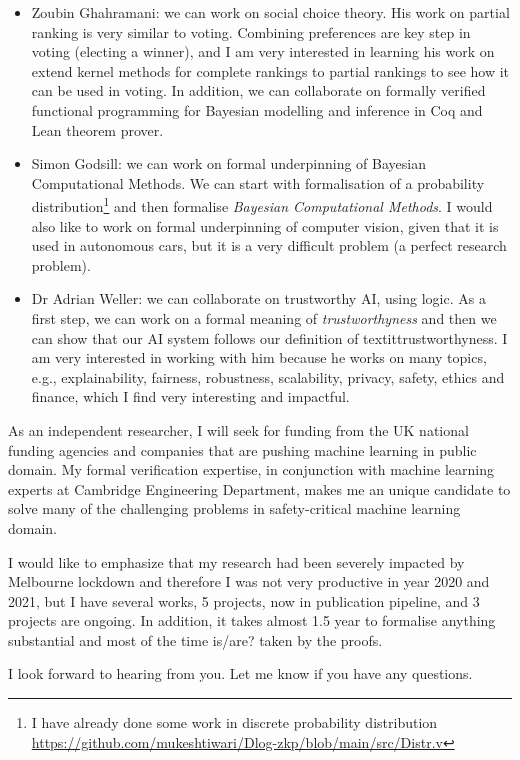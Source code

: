 \documentclass[11pt,a4paper,roman]{moderncv}
\begin{document}
\begin{itemize}
  \item Zoubin Ghahramani: we can work on social choice theory. His work 
 on partial ranking is very similar to voting. Combining preferences 
 are key step in voting (electing a winner), 
 and I am very interested in learning his work on extend kernel
 methods for complete rankings to partial rankings to see how it 
 can be used in voting. In addition, we can collaborate 
 on formally verified functional programming 
 for Bayesian modelling and inference in Coq and Lean
 theorem prover.

\item Simon Godsill: we can work on formal underpinning 
  of Bayesian Computational Methods. We can start with formalisation of 
  a probability distribution\footnote{I have already done some 
  work in discrete probability distribution 
  \url{https://github.com/mukeshtiwari/Dlog-zkp/blob/main/src/Distr.v}}
  and then formalise \textit{Bayesian Computational Methods}. I would also 
  like to work on formal underpinning of computer vision, given 
  that it is used in autonomous cars, but it is a very difficult problem 
  (a perfect research problem).
\item Dr Adrian Weller: we can collaborate on trustworthy AI, using logic. 
  As a first step, we can work on a formal meaning of \textit{trustworthyness}
  and then we can show that our AI system follows our definition of textit{trustworthyness}.
  I am very interested in working with him because he works 
  on many topics, e.g.,  explainability, fairness, robustness, 
  scalability, privacy, safety, ethics and finance, which I find 
  very interesting and impactful.

\end{itemize}

As an independent researcher, I will seek for funding from the UK national funding 
agencies and companies that are pushing machine learning in public domain. 
My formal verification expertise, in conjunction with machine learning 
experts at Cambridge Engineering Department, makes me an unique candidate 
to solve many of the challenging problems in safety-critical machine 
learning domain.

I would like to emphasize that my research had been severely 
impacted by Melbourne lockdown and therefore I was not very productive 
in year 2020 and 2021, but I have several works, 5 projects, now in publication 
pipeline, and 3 projects are ongoing.  In addition, it takes almost 1.5 
year to formalise anything  substantial and most of the time is/are? 
taken by the proofs. 


\vspace{0.5cm}
I look forward to hearing from you. Let me know if you have any 
questions. \\
 

\vspace{0.5cm}


\makeletterclosing
\end{document}
